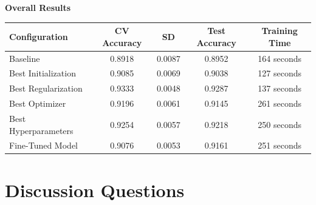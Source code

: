 \documentclass[10pt]{article}
\begin{document}
\textbf{Overall Results}
\vspace{5mm}
\begin{center}

\begin{tabular}[H]{|l|c|c|c|c|}
\hline
Configuration & CV Accuracy & SD & Test Accuracy & Training Time\\
\hline

Baseline & 0.8918 & 0.0087 & 0.8952 & 164 seconds\\

Best Initialization & 0.9085 & 0.0069 & 0.9038 & 127 seconds\\

Best Regularization & 0.9333 & 0.0048 & 0.9287 & 137 seconds\\

Best Optimizer & 0.9196 & 0.0061 & 0.9145 & 261 seconds\\

Best Hyperparameters & 0.9254 & 0.0057 & 0.9218 & 250 seconds\\

Fine-Tuned Model & 0.9076 & 0.0053 & 0.9161 & 251 seconds\\

\hline
\end{tabular}

\end{center}
\clearpage
\section{Discussion Questions}
\end{document}
